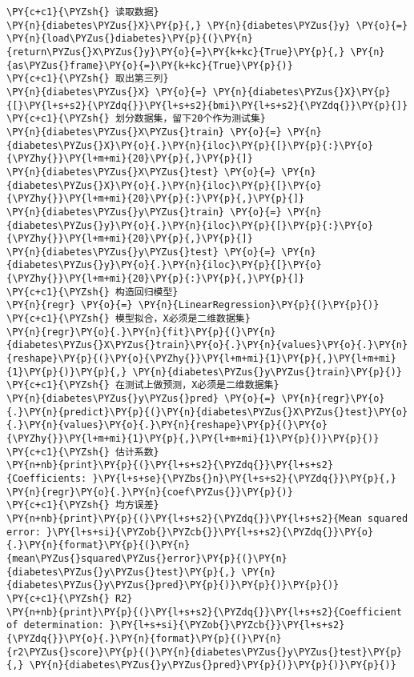 \begin{Verbatim}[commandchars=\\\{\}]
\PY{c+c1}{\PYZsh{} 读取数据}
\PY{n}{diabetes\PYZus{}X}\PY{p}{,} \PY{n}{diabetes\PYZus{}y} \PY{o}{=} \PY{n}{load\PYZus{}diabetes}\PY{p}{(}\PY{n}{return\PYZus{}X\PYZus{}y}\PY{o}{=}\PY{k+kc}{True}\PY{p}{,} \PY{n}{as\PYZus{}frame}\PY{o}{=}\PY{k+kc}{True}\PY{p}{)}
\PY{c+c1}{\PYZsh{} 取出第三列}
\PY{n}{diabetes\PYZus{}X} \PY{o}{=} \PY{n}{diabetes\PYZus{}X}\PY{p}{[}\PY{l+s+s2}{\PYZdq{}}\PY{l+s+s2}{bmi}\PY{l+s+s2}{\PYZdq{}}\PY{p}{]}
\PY{c+c1}{\PYZsh{} 划分数据集，留下20个作为测试集}
\PY{n}{diabetes\PYZus{}X\PYZus{}train} \PY{o}{=} \PY{n}{diabetes\PYZus{}X}\PY{o}{.}\PY{n}{iloc}\PY{p}{[}\PY{p}{:}\PY{o}{\PYZhy{}}\PY{l+m+mi}{20}\PY{p}{,}\PY{p}{]}
\PY{n}{diabetes\PYZus{}X\PYZus{}test} \PY{o}{=} \PY{n}{diabetes\PYZus{}X}\PY{o}{.}\PY{n}{iloc}\PY{p}{[}\PY{o}{\PYZhy{}}\PY{l+m+mi}{20}\PY{p}{:}\PY{p}{,}\PY{p}{]}
\PY{n}{diabetes\PYZus{}y\PYZus{}train} \PY{o}{=} \PY{n}{diabetes\PYZus{}y}\PY{o}{.}\PY{n}{iloc}\PY{p}{[}\PY{p}{:}\PY{o}{\PYZhy{}}\PY{l+m+mi}{20}\PY{p}{,}\PY{p}{]}
\PY{n}{diabetes\PYZus{}y\PYZus{}test} \PY{o}{=} \PY{n}{diabetes\PYZus{}y}\PY{o}{.}\PY{n}{iloc}\PY{p}{[}\PY{o}{\PYZhy{}}\PY{l+m+mi}{20}\PY{p}{:}\PY{p}{,}\PY{p}{]}
\PY{c+c1}{\PYZsh{} 构造回归模型}
\PY{n}{regr} \PY{o}{=} \PY{n}{LinearRegression}\PY{p}{(}\PY{p}{)}
\PY{c+c1}{\PYZsh{} 模型拟合，X必须是二维数据集}
\PY{n}{regr}\PY{o}{.}\PY{n}{fit}\PY{p}{(}\PY{n}{diabetes\PYZus{}X\PYZus{}train}\PY{o}{.}\PY{n}{values}\PY{o}{.}\PY{n}{reshape}\PY{p}{(}\PY{o}{\PYZhy{}}\PY{l+m+mi}{1}\PY{p}{,}\PY{l+m+mi}{1}\PY{p}{)}\PY{p}{,} \PY{n}{diabetes\PYZus{}y\PYZus{}train}\PY{p}{)}
\PY{c+c1}{\PYZsh{} 在测试上做预测，X必须是二维数据集}
\PY{n}{diabetes\PYZus{}y\PYZus{}pred} \PY{o}{=} \PY{n}{regr}\PY{o}{.}\PY{n}{predict}\PY{p}{(}\PY{n}{diabetes\PYZus{}X\PYZus{}test}\PY{o}{.}\PY{n}{values}\PY{o}{.}\PY{n}{reshape}\PY{p}{(}\PY{o}{\PYZhy{}}\PY{l+m+mi}{1}\PY{p}{,}\PY{l+m+mi}{1}\PY{p}{)}\PY{p}{)}
\PY{c+c1}{\PYZsh{} 估计系数}
\PY{n+nb}{print}\PY{p}{(}\PY{l+s+s2}{\PYZdq{}}\PY{l+s+s2}{Coefficients: }\PY{l+s+se}{\PYZbs{}n}\PY{l+s+s2}{\PYZdq{}}\PY{p}{,} \PY{n}{regr}\PY{o}{.}\PY{n}{coef\PYZus{}}\PY{p}{)}
\PY{c+c1}{\PYZsh{} 均方误差}
\PY{n+nb}{print}\PY{p}{(}\PY{l+s+s2}{\PYZdq{}}\PY{l+s+s2}{Mean squared error: }\PY{l+s+si}{\PYZob{}\PYZcb{}}\PY{l+s+s2}{\PYZdq{}}\PY{o}{.}\PY{n}{format}\PY{p}{(}\PY{n}{mean\PYZus{}squared\PYZus{}error}\PY{p}{(}\PY{n}{diabetes\PYZus{}y\PYZus{}test}\PY{p}{,} \PY{n}{diabetes\PYZus{}y\PYZus{}pred}\PY{p}{)}\PY{p}{)}\PY{p}{)}
\PY{c+c1}{\PYZsh{} R2}
\PY{n+nb}{print}\PY{p}{(}\PY{l+s+s2}{\PYZdq{}}\PY{l+s+s2}{Coefficient of determination: }\PY{l+s+si}{\PYZob{}\PYZcb{}}\PY{l+s+s2}{\PYZdq{}}\PY{o}{.}\PY{n}{format}\PY{p}{(}\PY{n}{r2\PYZus{}score}\PY{p}{(}\PY{n}{diabetes\PYZus{}y\PYZus{}test}\PY{p}{,} \PY{n}{diabetes\PYZus{}y\PYZus{}pred}\PY{p}{)}\PY{p}{)}\PY{p}{)}

\end{Verbatim}
